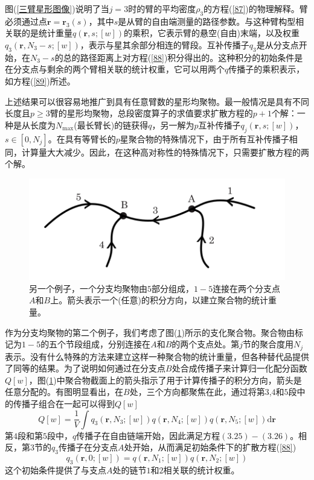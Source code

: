 图(\ref{三臂星形图像})说明了当$j=3$时的臂的平均密度$\rho _3$的方程(\ref{87})的物理解释。臂必须通过点$\mathbf{r}=\mathbf{r}_3(s)$，其中$s$是从臂的自由端测量的路径参数。与这种臂构型相关联的是统计重量$q(\mathbf{r},s;[w])$的乘积，它表示臂的悬空(自由)末端，以及权重$q_{3}(\mathbf{r},N_{3}-s;[w])$，表示与星其余部分相连的臂段。互补传播子$q_3$是从分支点开始，在$N_3-s$的总的路径距离上对方程(\ref{88})积分得出的。这种积分的初始条件是在分支点与剩余的两个臂相关联的统计权重，它可以用两个$q$传播子的乘积表示，如方程(\ref{89})所述。

上述结果可以很容易地推广到具有任意臂数的星形均聚物。最一般情况是具有不同长度且$p\geq3$臂的星形均聚物，总段密度算子的求值要求扩散方程的$p+1$个解：一种是从长度为$N_{\max}$(最长臂长)的链获得$q$，另一解为$p$互补传播子$q_j(\mathbf{r},s;[w])$，$s\in [0,N_j]$。在具有等臂长的$p$星聚合物的特殊情况下，由于所有互补传播子相同，计算量大大减少。因此，在这种高对称性的特殊情况下，只需要扩散方程的两个解。

\begin{figure}[H]
\centering
\includegraphics[scale=0.7]{./figures/36.png}
\caption{另一个例子，一个分支均聚物由$5$部分组成，$1-5$连接在两个分支点$A$和$B$上。箭头表示一个(任意)的积分方向，以建立聚合物的统计重量。}
\label{AB嵌段}
\end{figure}

作为分支均聚物的第二个例子，我们考虑了图(\ref{AB嵌段})所示的支化聚合物。聚合物由标记为$1-5$的五个节段组成，分别连接在$A$和$B$的两个支点处。第$j$节的聚合度用$N_j$表示。没有什么特殊的方法来建立这样一种聚合物的统计重量，但各种替代品提供了同等的结果。为了说明如何通过在分支点$B$处合成传播子来计算归一化配分函数$Q[w]$，图(\ref{AB嵌段})中聚合物截面上的箭头指示了用于计算传播子的积分方向，箭头是任意分配的。有图明显看出，在$B$处，三个方向都聚焦在此，通过将第$3$,$4$和$5$段中的传播子组合在一起可以得到$Q[w]$
\begin{equation}
Q[w]=\frac{1}{V}\int q_3(\mathbf{r},N_3;[w])q(\mathbf{r},N_4;[w])q(\mathbf{r},N_5;[w]) \mathrm{d}\mathbf{r}
\end{equation}
第$4$段和第$5$段中，$q$传播子在自由链端开始，因此满足方程$(3.25)-(3.26)$。相反，第3节的$q_3$传播子在分支点$A$处开始，从而满足初始条件下的扩散方程(\ref{88})
\begin{equation}
q_3(\mathbf{r},0;[w])=q(\mathbf{r},N_1;[w])q(\mathbf{r},N_2;[w])
\end{equation}
这个初始条件提供了与支点$A$处的链节$1$和$2$相关联的统计权重。

